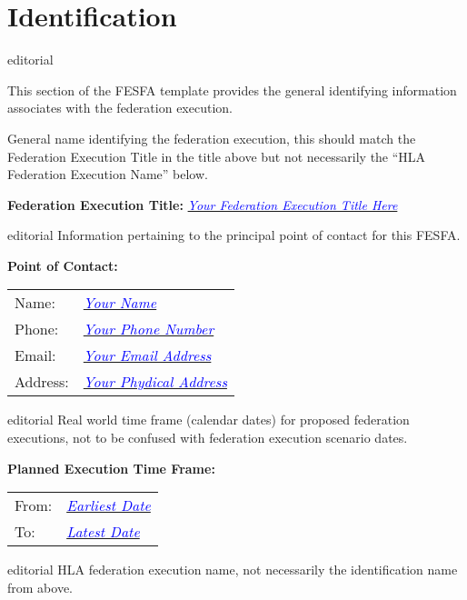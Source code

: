 \documentclass[11pt,english,letterpaper]{article}
\newcommand{\example}[1]{{\textcolor{blue}{\textit{#1}}}}
\begin{document}
\section*{Identification}

\begin{shownto}{editorial}
{\color{red} This section of the FESFA template provides the general
identifying information associates with the federation execution.

General name identifying the federation execution, this should match the
\textlangle{}Federation Execution Title\textrangle{} in the title above but not
necessarily the “HLA Federation Execution Name” below.}
\end{shownto}

\textbf{Federation Execution Title: } \underline{\example{Your Federation Execution Title Here}}

\begin{shownto}{editorial}
{\color{red} Information pertaining to the principal point of contact for this FESFA.}
\end{shownto}

\textbf{Point of Contact: }

\hspace{0.25in}
\begin{tabularx}{\textwidth}{lX}
Name:    & \underline{\example{Your Name}} \\
Phone:   & \underline{\example{Your Phone Number}} \\
Email:   & \underline{\example{Your Email Address}} \\
Address: & \underline{\example{Your Phydical Address}}
\end{tabularx}

\begin{shownto}{editorial}
{\color{red} Real world time frame (calendar dates) for proposed federation
executions, not to be confused with federation execution scenario dates.}
\end{shownto}

\textbf{Planned Execution Time Frame: }

\hspace{0.25in}
\begin{tabular}{ll}
From: & \underline{\example{Earliest Date}} \\
To:   & \underline{\example{Latest Date}}
\end{tabular}

\begin{shownto}{editorial}
{\color{red} HLA federation execution name, not necessarily the identification
name from above.}
\end{shownto}
\end{document}
